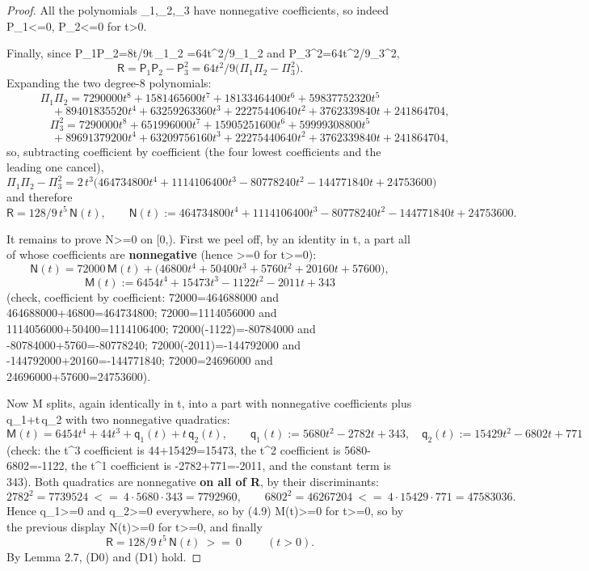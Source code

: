 \documentclass[10pt,reqno]{amsart}
\def\({}\def\){}%
\def\frac#1#2{#1/#2}%
\def\ge{>=}\def\le{<=}%
\theoremstyle{definition}
\theoremstyle{remark}
\begin{document}
\begin{proof}
All the polynomials \(\Pi_1,\Pi_2,\Pi_3\) have nonnegative coefficients, so indeed \(\mathsf P_1\le0\), \(\mathsf P_2\le0\) for \(t>0\).

Finally, since \(\mathsf P_1\mathsf P_2=8t\cdot\frac89t\,\Pi_1\Pi_2
=\frac{64t^2}9\Pi_1\Pi_2\) and \(\mathsf P_3^2=\frac{64t^2}9\Pi_3^2\), \[\mathsf R=\mathsf P_1\mathsf P_2-\mathsf P_3^2=\frac{64t^2}9
\big(\Pi_1\Pi_2-\Pi_3^2\big).\] Expanding the two degree-\(8\) polynomials: \[\Pi_1\Pi_2=7290000t^8+1581465600t^7+18133464400t^6+59837752320t^5\] \[\qquad\qquad+89401835520t^4+63259263360t^3+22275440640t^2+3762339840t+241864704,\] \[\Pi_3^2=7290000t^8+651996000t^7+15905251600t^6+59999308800t^5\] \[\qquad\qquad+89691379200t^4+63209756160t^3+22275440640t^2+3762339840t+241864704,\] so, subtracting coefficient by coefficient (the four lowest coefficients and the leading one cancel), \[\Pi_1\Pi_2-\Pi_3^2
=2\,t^3\big(464734800t^4+1114106400t^3-80778240t^2-144771840t+24753600\big)\] and therefore \[\mathsf R=\frac{128}9\,t^{5}\,\mathsf N(t),\qquad
\mathsf N(t):=464734800t^4+1114106400t^3-80778240t^2-144771840t+24753600 . \tag{4.7}\]

It remains to prove \(\mathsf N\ge0\) on \([0,\infty)\). First we peel off, by an identity in \(t\), a part all of whose coefficients are \textbf{nonnegative} (hence \(\ge0\) for \(t\ge0\)): \[\mathsf N(t)=72000\,\mathsf M(t)+\big(46800t^4+50400t^3+5760t^2+20160t+57600\big),\] \[\mathsf M(t):=6454t^4+15473t^3-1122t^2-2011t+343 \tag{4.8}\] (check, coefficient by coefficient: \(72000=464688000\) and \(464688000+46800=464734800\); \(72000=1114056000\) and \(1114056000+50400=1114106400\); \(72000\cdot(-1122)=-80784000\) and \(-80784000+5760=-80778240\); \(72000\cdot(-2011)=-144792000\) and \(-144792000+20160=-144771840\); \(72000=24696000\) and \(24696000+57600=24753600\)).

Now \(\mathsf M\) splits, again identically in \(t\), into a part with nonnegative coefficients plus \(\mathsf q_1+t\,\mathsf q_2\) with two nonnegative quadratics: \[\mathsf M(t)=6454t^4+44t^3+\mathsf q_1(t)+t\,\mathsf q_2(t),\qquad
\mathsf q_1(t):=5680t^2-2782t+343,\quad \mathsf q_2(t):=15429t^2-6802t+771
\tag{4.9}\] (check: the \(t^3\) coefficient is \(44+15429=15473\), the \(t^2\) coefficient is \(5680-6802=-1122\), the \(t^1\) coefficient is \(-2782+771=-2011\), and the constant term is \(343\)). Both quadratics are nonnegative \textbf{on all of \(\mathbb R\)}, by their discriminants: \[2782^2=7739524\ \le\ 4\cdot5680\cdot343=7792960,\qquad
6802^2=46267204\ \le\ 4\cdot15429\cdot771=47583036 .\] Hence \(\mathsf q_1\ge0\) and \(\mathsf q_2\ge0\) everywhere, so by (4.9) \(\mathsf M(t)\ge0\) for \(t\ge0\), so by the previous display \(\mathsf N(t)\ge0\) for \(t\ge0\), and finally \[\boxed{\ \mathsf R=\frac{128}9\,t^{5}\,\mathsf N(t)\ \ge\ 0\ \qquad(t>0).\ }\] By Lemma 2.7, (D0) and (D1) hold.
\end{proof}
\end{document}
